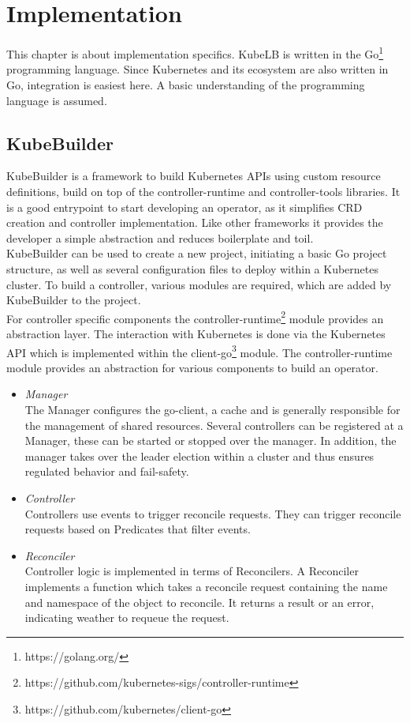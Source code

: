 \chapter{Implementation}

This chapter is about implementation specifics.
KubeLB is written in the Go\footnote{https://golang.org/} programming language.
Since Kubernetes and its ecosystem are also written in Go, integration is easiest here.
A basic understanding of the programming language is assumed.

\section{KubeBuilder}

KubeBuilder is a framework to build Kubernetes APIs using custom resource definitions, build on top of the controller-runtime and controller-tools libraries.
It is a good entrypoint to start developing an operator, as it simplifies CRD creation and controller implementation.
Like other frameworks it provides the developer a simple abstraction and reduces boilerplate and toil.
\\
KubeBuilder can be used to create a new project, initiating a basic Go project structure, as well as several configuration files to deploy within a Kubernetes cluster.
To build a controller, various modules are required, which are added by KubeBuilder to the project.
\\
\newpage
For controller specific components the controller-runtime\footnote{https://github.com/kubernetes-sigs/controller-runtime} module provides an abstraction layer.
The interaction with Kubernetes is done via the Kubernetes API which is implemented within the client-go\footnote{https://github.com/kubernetes/client-go} module.
The controller-runtime module provides an abstraction for various components to build an operator.

\begin{itemize}
    \item \textit{Manager} \\
    The Manager configures the go-client, a cache and is generally responsible for the management of shared resources.
    Several controllers can be registered at a Manager, these can be started or stopped over the manager.
    In addition, the manager takes over the leader election within a cluster and thus ensures regulated behavior and fail-safety.
    \item \textit{Controller} \\
    Controllers use events to trigger reconcile requests.
    They can trigger reconcile requests based on Predicates that filter events.
    \item \textit{Reconciler} \\
    Controller logic is implemented in terms of Reconcilers.
    A Reconciler implements a function which takes a reconcile request containing the name and namespace of the object to reconcile.
    It returns a result or an error, indicating weather to requeue the request.
\end{itemize}

